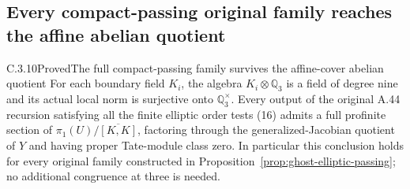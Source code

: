 \subsection{Every compact-passing original family reaches the affine abelian quotient}
\label{sec:ghost-boundary-local-norm}

\begin{result}{C.3.10}{Proved}{The full compact-passing family survives the affine-cover abelian quotient}
\label{prop:ghost-all-passing-genjac}
For each boundary field \(K_i\), the algebra
\(K_i\otimes\mathbb Q_3\) is a field of degree nine
and its actual local norm is surjective onto
\(\mathbb Q_3^\times\).
Every output of the original A.44 recursion satisfying
all the finite elliptic order tests (16) admits a full
profinite section of
\(\pi_1(U)/\overline{[K,K]}\), factoring through the
generalized-Jacobian quotient of \(Y\) and having proper
Tate-module class zero. In particular this conclusion
holds for every original family constructed in
Proposition~\ref{prop:ghost-elliptic-passing}; no
additional congruence at three is needed.
\end{result}
